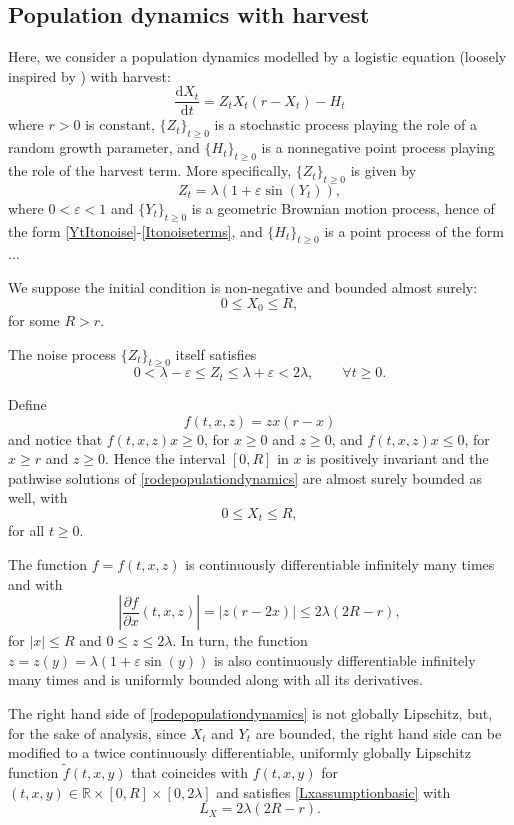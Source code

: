 \documentclass[reqno,12pt]{amsart}
\theoremstyle{plain}%
\theoremstyle{definition}
\begin{document}
\subsection{Population dynamics with harvest}

Here, we consider a population dynamics modelled by a logistic equation (loosely inspired by \cite[Section 15.2]{HanKloeden2017}) with harvest:
\begin{equation}
    \label{rodepopulationdynamics}
    \frac{\mathrm{d}X_t}{\mathrm{d}t} = Z_t X_t (r - X_t) - H_t
\end{equation}
where $r > 0$ is constant, $\{Z_t\}_{t \geq 0}$ is a stochastic process playing the role of a random growth parameter, and $\{H_t\}_{t\geq 0}$ is a nonnegative point process playing the role of the harvest term. More specifically, $\{Z_t\}_{t \geq 0}$ is given by
\[
    Z_t = \lambda (1 + \varepsilon \sin(Y_t)),
\]
where $0 < \varepsilon < 1$ and $\{Y_t\}_{t\geq 0}$ is a geometric Brownian motion process, hence of the form \eqref{YtItonoise}-\eqref{Itonoiseterms}, and $\{H_t\}_{t\geq 0}$ is a point process of the form ...

We suppose the initial condition is non-negative and bounded almost surely:
\[
    0 \leq X_0 \leq R,
\]
for some $R > r$.

The noise process $\{Z_t\}_{t \geq 0}$ itself satisfies
\[
    0 < \lambda - \varepsilon \leq Z_t \leq \lambda + \varepsilon < 2\lambda, \qquad \forall t \geq 0.
\]

Define 
\[
    f(t, x, z) = z x(r - x)
\]
and notice that $f(t, x, z)x \geq 0$, for $x \geq 0$ and $z \geq 0$, and $f(t, x, z)x \leq 0$, for $x \geq r$ and $z \geq 0$. Hence the interval $[0, R]$ in $x$ is positively invariant and the pathwise solutions of \eqref{rodepopulationdynamics} are almost surely bounded as well, with
\[
    0 \leq X_t \leq R,
\]
for all $t \geq 0$.

The function $f=f(t, x, z)$ is continuously differentiable infinitely many times and with
\[
    \left|\frac{\partial f}{\partial x}(t, x, z)\right| = |z(r - 2x)|\leq 2\lambda (2R - r),
\]
for $|x| \leq R$ and $0 \leq z \leq 2\lambda$. In turn, the function $z = z(y) = \lambda (1 + \varepsilon \sin(y))$ is also continuously differentiable infinitely many times and is uniformly bounded along with all its derivatives.

The right hand side of \eqref{rodepopulationdynamics} is not globally Lipschitz, but, for the sake of analysis, since $X_t$ and $Y_t$ are bounded, the right hand side can be modified to a twice continuously differentiable, uniformly globally Lipschitz function $\tilde f(t, x, y)$ that coincides with $f(t, x, y)$ for $(t, x, y) \in \mathbb{R}\times [0, R]\times [0, 2\lambda]$ and satisfies \eqref{Lxassumptionbasic} with
\[
    L_X = 2\lambda (2R - r).
\]
\end{document}
